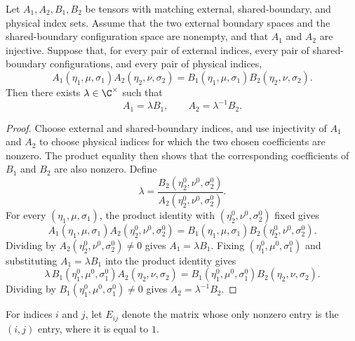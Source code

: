 \begin{theorem}%
    \label{thm:peps_twoBlockPointwiseProductCancellation}
    \leanok
    Let $A_1,A_2,B_1,B_2$ be tensors with matching external,
    shared-boundary, and physical index sets. Assume that the two external
    boundary spaces and the shared-boundary configuration space are nonempty,
    and that $A_1$ and $A_2$ are injective. Suppose that, for every pair of
    external indices, every pair of shared-boundary configurations, and every
    pair of physical indices,
    \[
        A_1(\eta_1,\mu,\sigma_1)A_2(\eta_2,\nu,\sigma_2)
        =
        B_1(\eta_1,\mu,\sigma_1)B_2(\eta_2,\nu,\sigma_2).
    \]
    Then there exists $\lambda\in\C^\times$ such that
    \[
        A_1=\lambda B_1,\qquad
        A_2=\lambda^{-1}B_2.
    \]
\end{theorem}
\begin{proof}\leanok
    Choose external and shared-boundary indices, and use injectivity of
    $A_1$ and $A_2$ to choose physical indices for which the two chosen
    coefficients are nonzero. The product equality then shows that the
    corresponding coefficients of $B_1$ and $B_2$ are also nonzero. Define
    \[
        \lambda =
        \frac{B_2(\eta_2^0,\nu^0,\sigma_2^0)}
        {A_2(\eta_2^0,\nu^0,\sigma_2^0)}.
    \]
    For every $(\eta_1,\mu,\sigma_1)$, the product identity with
    $(\eta_2^0,\nu^0,\sigma_2^0)$ fixed gives
    \[
        A_1(\eta_1,\mu,\sigma_1)
        A_2(\eta_2^0,\nu^0,\sigma_2^0)
        =
        B_1(\eta_1,\mu,\sigma_1)
        B_2(\eta_2^0,\nu^0,\sigma_2^0).
    \]
    Dividing by $A_2(\eta_2^0,\nu^0,\sigma_2^0)\ne0$ gives
    $A_1=\lambda B_1$. Fixing $(\eta_1^0,\mu^0,\sigma_1^0)$ and substituting
    $A_1=\lambda B_1$ into the product identity gives
    \[
        \lambda\, B_1(\eta_1^0,\mu^0,\sigma_1^0)
        A_2(\eta_2,\nu,\sigma_2)
        =
        B_1(\eta_1^0,\mu^0,\sigma_1^0) B_2(\eta_2,\nu,\sigma_2).
    \]
    Dividing by $B_1(\eta_1^0,\mu^0,\sigma_1^0)\ne0$ gives
    $A_2=\lambda^{-1}B_2$.
\end{proof}

\begin{definition}%
    \label{def:peps_matrixUnit}
    \leanok
    For indices $i$ and $j$, let $E_{ij}$ denote the matrix whose only
    nonzero entry is the $(i,j)$ entry, where it is equal to $1$.
\end{definition}

